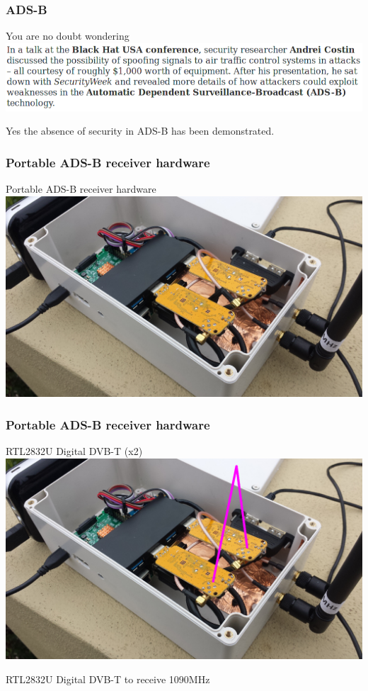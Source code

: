 \begin{frame}
\frametitle{ADS-B}
\begin{block}{You are no doubt wondering}
\includegraphics[height=0.18\textheight]{image/adsb-security.png}
\end{block}
Yes the absence of security in ADS-B has been demonstrated.
\end{frame}

\begin{frame}
\frametitle{Portable ADS-B receiver hardware}
\begin{block}{Portable ADS-B receiver hardware}
\includegraphics[height=0.5\textheight]{image/adsb-hardware.png}
\end{block}
\end{frame}

\begin{frame}
\frametitle{Portable ADS-B receiver hardware}
\begin{block}{RTL2832U Digital DVB-T (x2)}
\includegraphics[height=0.5\textheight]{image/adsb-hardware-dvb.png}

RTL2832U Digital DVB-T to receive 1090MHz
\end{block}
\end{frame}

